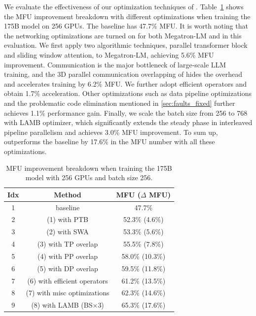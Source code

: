 We evaluate the effectiveness of our optimization techniques of {\sysname}.
Table~\ref{tab:exp-ablation} shows the MFU improvement breakdown with different
optimizations when training the 175B model on 256 GPUs. The baseline  has 47.7\%
MFU. It is worth noting that the networking optimizations are 
turned on for both Megatron-LM and {\sysname} in this evaluation. We first apply 
two algorithmic techniques, parallel transformer block and
sliding window attention, to Megatron-LM, achieving 5.6\% MFU improvement. 
Communication is the major bottleneck of large-scale LLM training, and
the 3D parallel communication overlapping of {\sysname} hides the overhead and
accelerates training by 6.2\% MFU. We further adopt efficient operators and obtain 
1.7\% acceleration. Other optimizations such as data pipeline 
optimizations and the problematic code elimination mentioned 
in \ref{sec:faults_fixed} further achieves 1.1\%
performance gain. Finally, we scale the batch size from 256 to 768 with LAMB
optimizer, which significantly extends the steady phase in interleaved pipeline
parallelism and achieves 3.0\% MFU improvement.  To sum up, {\sysname}
outperforms the baseline by 17.6\% in the MFU number with all these
optimizations.


\begin{table}[t]
    \centering
    \begin{tabular}{|c|c|c|}
        \hline
        Idx & Method & MFU ($\Delta$ MFU) \\
        \hline
        1 &  baseline & 47.7\% \\
        2 &  (1) with PTB & 52.3\% (4.6\%)  \\
        3 &  (2) with SWA & 53.3\% (5.6\%) \\
        4 &  (3) with TP overlap & 55.5\% (7.8\%) \\
        5 &  (4) with PP overlap &  58.0\% (10.3\%)\\
        6 &  (5) with DP overlap &  59.5\% (11.8\%)\\
        7 &  (6) with efficient operators &  61.2\% (13.5\%)\\
        8 &  (7) with misc optimizations & 62.3\% (14.6\%)  \\
        9 & (8) with LAMB (BS$\times$3) &  65.3\% (17.6\%)\\
         \hline
    \end{tabular}
    \caption{MFU improvement breakdown when training the 175B model with 256 GPUs and batch size 256.}
    \label{tab:exp-ablation}
\end{table}

